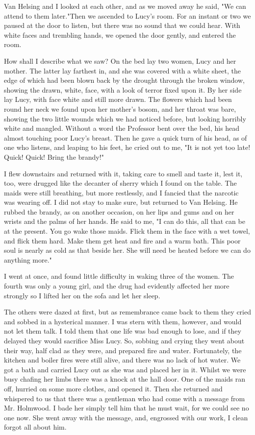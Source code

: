 Van Helsing and I looked at each other, and as we moved away he said, "We can attend to them later."Then we ascended to Lucy's room. For an instant or two we paused at the door to listen, but there was no sound that we could hear. With white faces and trembling hands, we opened the door gently, and entered the room. 

How shall I describe what we saw? On the bed lay two women, Lucy and her mother. The latter lay farthest in, and she was covered with a white sheet, the edge of which had been blown back by the drought through the broken window, showing the drawn, white, face, with a look of terror fixed upon it. By her side lay Lucy, with face white and still more drawn. The flowers which had been round her neck we found upon her mother's bosom, and her throat was bare, showing the two little wounds which we had noticed before, but looking horribly white and mangled. Without a word the Professor bent over the bed, his head almost touching poor Lucy's breast. Then he gave a quick turn of his head, as of one who listens, and leaping to his feet, he cried out to me, "It is not yet too late! Quick! Quick! Bring the brandy!" 

I flew downstairs and returned with it, taking care to smell and taste it, lest it, too, were drugged like the decanter of sherry which I found on the table. The maids were still breathing, but more restlessly, and I fancied that the narcotic was wearing off. I did not stay to make sure, but returned to Van Helsing. He rubbed the brandy, as on another occasion, on her lips and gums and on her wrists and the palms of her hands. He said to me, "I can do this, all that can be at the present. You go wake those maids. Flick them in the face with a wet towel, and flick them hard. Make them get heat and fire and a warm bath. This poor soul is nearly as cold as that beside her. She will need be heated before we can do anything more." 

I went at once, and found little difficulty in waking three of the women. The fourth was only a young girl, and the drug had evidently affected her more strongly so I lifted her on the sofa and let her sleep. 

The others were dazed at first, but as remembrance came back to them they cried and sobbed in a hysterical manner. I was stern with them, however, and would not let them talk. I told them that one life was bad enough to lose, and if they delayed they would sacrifice Miss Lucy. So, sobbing and crying they went about their way, half clad as they were, and prepared fire and water. Fortunately, the kitchen and boiler fires were still alive, and there was no lack of hot water. We got a bath and carried Lucy out as she was and placed her in it. Whilst we were busy chafing her limbs there was a knock at the hall door. One of the maids ran off, hurried on some more clothes, and opened it. Then she returned and whispered to us that there was a gentleman who had come with a message from Mr. Holmwood. I bade her simply tell him that he must wait, for we could see no one now. She went away with the message, and, engrossed with our work, I clean forgot all about him. 

